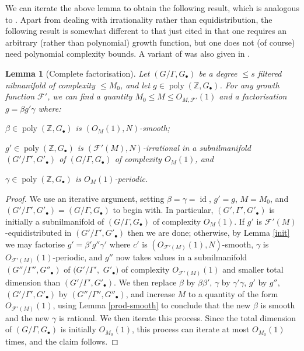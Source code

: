 \documentclass[11pt,reqno]{amsart}
\numberwithin{equation}{section}
\theoremstyle{plain}
\newtheorem{lemma}[subsection]{Lemma}
\theoremstyle{definition}
\renewcommand{\leq}{\leqslant}
\newcommand\Z{\mathbb{Z}}
\newcommand\1{{\bf 1}}
\newcommand\2{{\bf 2}}
\newcommand\poly{\operatorname{poly}}
\newcommand\id{\operatorname{id}}
\newcommand\Grow{{\mathcal F}}
\begin{document}
We can iterate the above lemma to obtain the following result, which is analogous to \cite[Theorem 1.19]{green-tao-nilratner}. Apart from dealing with irrationality rather than equidistribution, the following result is somewhat different to that just cited in that one requires an arbitrary (rather than polynomial) growth function, but one does not (of course) need polynomial complexity bounds. A variant of \cite[Theorem 1.19]{green-tao-nilratner} was also given in \cite[Theorem 4.2]{green-tao-ziegler-u4inverse}.

\begin{lemma}[Complete factorisation]\label{factor}   Let $(G/\Gamma,G_\bullet)$ be a degree $\leq s$ filtered nilmanifold of complexity $\leq M_0$, and let $g \in \poly(\Z, G_\bullet)$.  For any growth function $\Grow'$, we can find a quantity $M_0 \leq M \leq O_{M,\Grow'}(1)$ and a factorisation $g = \beta g' \gamma$ where:

$\beta \in \poly(\Z,G_\bullet)$ is $(O_{M}(1),N)$-smooth;

$g' \in \poly(\Z,G_\bullet)$ is $(\Grow'(M),N)$-irrational in a subnilmanifold $(G'/\Gamma',G'_\bullet)$ of $(G/\Gamma,G_\bullet)$ of complexity $O_M(1)$, and

$\gamma \in \poly(\Z,G_\bullet)$ is $O_M(1)$-periodic.
\end{lemma}

\begin{proof}  We use an iterative argument, setting $\beta =  \gamma = \id$, $g'=g$, $M= M_0$, and $(G'/\Gamma',G'_\bullet) =(G/\Gamma,G_\bullet)$ to begin with.  In particular, $(G',\Gamma',G'_\bullet)$ is initially a subnilmanifold of $(G/\Gamma,G_\bullet)$ of complexity $O_{M}(1)$.
If $g'$ is $\Grow'(M)$-equidistributed in $(G'/\Gamma',G'_\bullet)$ then we are done; otherwise, by Lemma \ref{init} we may factorise $g' = \beta' g'' \gamma'$ where $c'$ is $(O_{\Grow'(M)}(1),N)$-smooth, $\gamma$ is $O_{\Grow'(M)}(1)$-periodic, and $g''$ now takes values in a subnilmanifold $(G''/\Gamma'',G''_\bullet)$ of $(G'/\Gamma',$ $G'_\bullet)$ of complexity $O_{\Grow'(M)}(1)$ and smaller total dimension than $(G'/\Gamma',G'_\bullet)$.  We then replace $\beta$ by $\beta\beta'$, $\gamma$ by $\gamma' \gamma$, $g'$ by $g''$, $(G'/\Gamma',G'_\bullet)$ by $(G''/\Gamma'',G''_\bullet)$, and increase $M$ to a quantity of the form $O_{\Grow'(M)}(1)$, using Lemma \ref{prod-smooth} to conclude that the new $\beta$ is smooth and the new $\gamma$ is rational.  We then iterate this process.  Since the total dimension of $(G/\Gamma,G_\bullet)$ is initially $O_{M_0}(1)$, this process can iterate at most $O_{M_0}(1)$ times, and the claim follows.
\end{proof}
\end{document}
